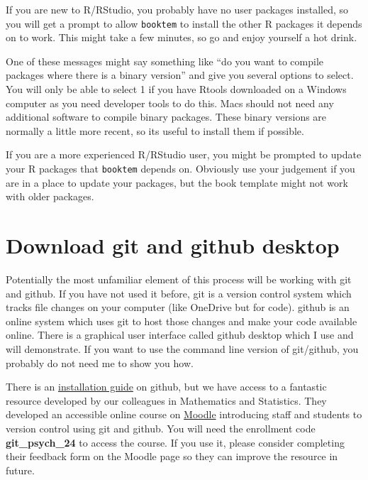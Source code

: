 \documentclass[
  letterpaper,
  DIV=11,
  numbers=noendperiod]{scrreprt}
\begin{document}
If you are new to R/RStudio, you probably have no user packages
installed, so you will get a prompt to allow \texttt{booktem} to install
the other R packages it depends on to work. This might take a few
minutes, so go and enjoy yourself a hot drink.

\begin{tcolorbox}[enhanced jigsaw, colbacktitle=quarto-callout-caution-color!10!white, titlerule=0mm, leftrule=.75mm, title=\textcolor{quarto-callout-caution-color}{\faFire}\hspace{0.5em}{Caution}, breakable, bottomrule=.15mm, opacitybacktitle=0.6, rightrule=.15mm, opacityback=0, arc=.35mm, colframe=quarto-callout-caution-color-frame, toptitle=1mm, bottomtitle=1mm, toprule=.15mm, left=2mm, colback=white, coltitle=black]

One of these messages might say something like ``do you want to compile
packages where there is a binary version'' and give you several options
to select. You will only be able to select 1 if you have Rtools
downloaded on a Windows computer as you need developer tools to do this.
Macs should not need any additional software to compile binary packages.
These binary versions are normally a little more recent, so its useful
to install them if possible.

\end{tcolorbox}

If you are a more experienced R/RStudio user, you might be prompted to
update your R packages that \texttt{booktem} depends on. Obviously use
your judgement if you are in a place to update your packages, but the
book template might not work with older packages.

\section{Download git and github desktop}\label{github_prep}

Potentially the most unfamiliar element of this process will be working
with git and github. If you have not used it before, git is a version
control system which tracks file changes on your computer (like OneDrive
but for code). github is an online system which uses git to host those
changes and make your code available online. There is a graphical user
interface called github desktop which I use and will demonstrate. If you
want to use the command line version of git/github, you probably do not
need me to show you how.

There is an
\href{https://github.com/git-guides/install-git}{installation guide} on
github, but we have access to a fantastic resource developed by our
colleagues in Mathematics and Statistics. They developed an accessible
online course on
\href{https://moodle.gla.ac.uk/course/view.php?id=41115}{Moodle}
introducing staff and students to version control using git and github.
You will need the enrollment code \textbf{git\_psych\_24} to access the
course. If you use it, please consider completing their feedback form on
the Moodle page so they can improve the resource in future.
\end{document}
